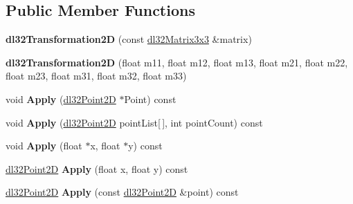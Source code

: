 \subsection*{Public Member Functions}
\begin{DoxyCompactItemize}
\item 
\hypertarget{classdl32_transformation2_d_abc6af6d65d94c8102e90cdac6479e261}{{\bfseries dl32\-Transformation2\-D} (const \hyperlink{structdl32_matrix3x3}{dl32\-Matrix3x3} \&matrix)}\label{classdl32_transformation2_d_abc6af6d65d94c8102e90cdac6479e261}

\item 
\hypertarget{classdl32_transformation2_d_a56ca9ee745e7002903580e5c0cc6117a}{{\bfseries dl32\-Transformation2\-D} (float m11, float m12, float m13, float m21, float m22, float m23, float m31, float m32, float m33)}\label{classdl32_transformation2_d_a56ca9ee745e7002903580e5c0cc6117a}

\item 
\hypertarget{classdl32_transformation2_d_a29b630131be0ccb3f35c1fd03978d7e5}{void {\bfseries Apply} (\hyperlink{structdl32_point2_d}{dl32\-Point2\-D} $\ast$Point) const }\label{classdl32_transformation2_d_a29b630131be0ccb3f35c1fd03978d7e5}

\item 
\hypertarget{classdl32_transformation2_d_a240adfd595f5e51b2743ee5568437f6e}{void {\bfseries Apply} (\hyperlink{structdl32_point2_d}{dl32\-Point2\-D} point\-List\mbox{[}$\,$\mbox{]}, int point\-Count) const }\label{classdl32_transformation2_d_a240adfd595f5e51b2743ee5568437f6e}

\item 
\hypertarget{classdl32_transformation2_d_a9638c965ae9179172409abb8d3c502d8}{void {\bfseries Apply} (float $\ast$x, float $\ast$y) const }\label{classdl32_transformation2_d_a9638c965ae9179172409abb8d3c502d8}

\item 
\hypertarget{classdl32_transformation2_d_ac7a7d9b33e56d8d62235821344294725}{\hyperlink{structdl32_point2_d}{dl32\-Point2\-D} {\bfseries Apply} (float x, float y) const }\label{classdl32_transformation2_d_ac7a7d9b33e56d8d62235821344294725}

\item 
\hypertarget{classdl32_transformation2_d_ac800bb725d69d49184fd191114aaf5db}{\hyperlink{structdl32_point2_d}{dl32\-Point2\-D} {\bfseries Apply} (const \hyperlink{structdl32_point2_d}{dl32\-Point2\-D} \&point) const }\label{classdl32_transformation2_d_ac800bb725d69d49184fd191114aaf5db}


\end{DoxyCompactItemize}
